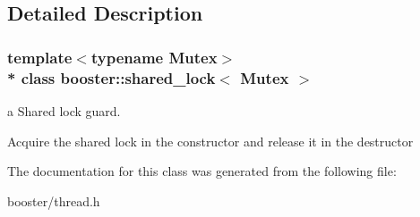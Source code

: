\subsection{Detailed Description}
\subsubsection*{template$<$typename Mutex$>$\\*
class booster\+::shared\+\_\+lock$<$ Mutex $>$}

a Shared lock guard. 

Acquire the shared lock in the constructor and release it in the destructor 

The documentation for this class was generated from the following file\+:\begin{DoxyCompactItemize}
\item 
booster/thread.\+h\end{DoxyCompactItemize}
